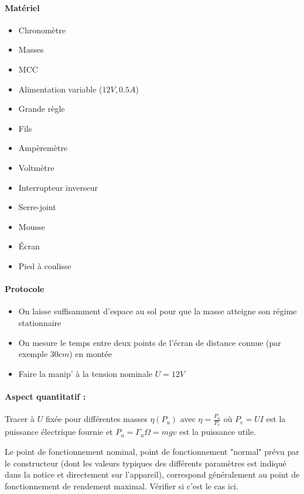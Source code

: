 \documentclass[11pt]{report}
\numberwithin{figure}{section}
\numberwithin{equation}{section}
\numberwithin{table}{section}
\newcommand{\1}{\boldsymbol{1}}
\begin{document}
\begin{tcolorbox}[breakable, enhanced, colback=red!2!white,colframe=mycolor!85!black,title=\textbf{\textbf{Expérience}}]
\paragraph*{Matériel}
\begin{itemize}
\item Chronomètre
\item Masses
\item MCC
\item Alimentation variable ($12V, 0.5 A$)
\item Grande règle
\item Fils
\item Ampèremètre
\item Voltmètre
\item Interrupteur inverseur
\item Serre-joint
\item Mousse
\item Écran
\item Pied à coulisse
\end{itemize}

\paragraph*{Protocole } 

\begin{itemize}[label=$\triangleright$]
		\item On laisse suffisamment d'espace au sol pour que la masse atteigne son régime stationnaire
		\item On mesure le temps entre deux points de l'écran de distance connue (par exemple $30cm$) en montée
		\item Faire la manip' à la tension nominale $U = 12V$		
\end{itemize}

\paragraph*{Aspect quantitatif :} Tracer à $U$ fixée pour différentes masses $\eta(P_u)$ avec $\eta = \frac{P_u}{P_e}$ où $P_e = U I$ est la puissance électrique fournie et $P_u = \Gamma_u \Omega = m g v$ est la puissance utile.

Le point de fonctionnement nominal, point de fonctionnement "normal" prévu par le constructeur (dont les valeurs typiques des différents paramètres est indiqué dans la notice et directement sur l'appareil), correspond généralement au point de fonctionnement de rendement maximal. Vérifier si c'est le cas ici.

\end{tcolorbox}
\end{document}
